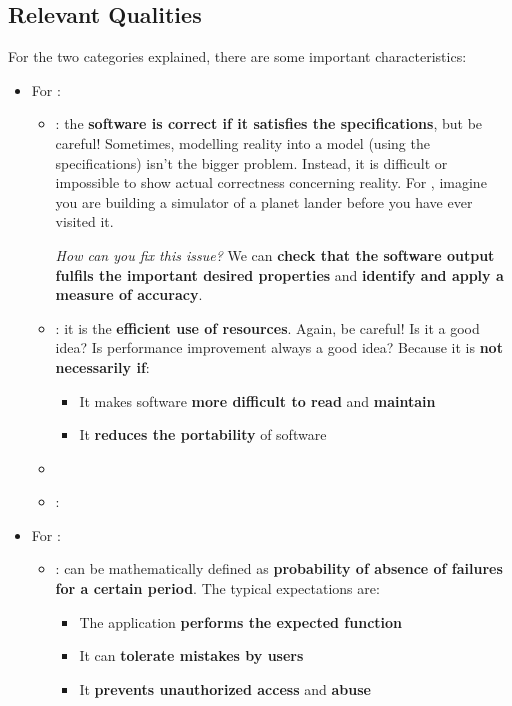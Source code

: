 \subsection{Relevant Qualities}

For the two categories explained, there are some important characteristics:
\begin{itemize}
    \item For :
    \begin{itemize}
        \item \underline{}: the \textbf{software is correct if it satisfies the specifications}, but be careful! Sometimes, modelling reality into a model (using the specifications) isn't the bigger problem. Instead, it is difficult or impossible to show actual correctness concerning reality. For , imagine you are building a simulator of a planet lander before you have ever visited it.
        
        \emph{How can you fix this issue?} We can \textbf{check that the software output fulfils the important desired properties} and \textbf{identify and apply a measure of accuracy}.

        
        \item \underline{}: it is the \textbf{efficient use of resources}. Again, be careful! Is it a good idea? Is performance improvement always a good idea? Because it is \textbf{not necessarily if}:
        \begin{itemize}
            \item It makes software \textbf{more difficult to read} and \textbf{maintain}
            \item It \textbf{reduces the portability} of software
        \end{itemize}
        
        
        \item \underline{}
        
        
        \item \underline{}: 
    \end{itemize}

    \item For :
    \begin{itemize}
        \item \underline{}: can be mathematically defined as \textbf{probability of absence of failures for a certain period}. The typical expectations are:
        \begin{itemize}
            \item The application \textbf{performs the expected function}
            \item It can \textbf{tolerate mistakes by users}
            \item It \textbf{prevents unauthorized access} and \textbf{abuse}
        \end{itemize}
        

\end{itemize}
\end{itemize}
